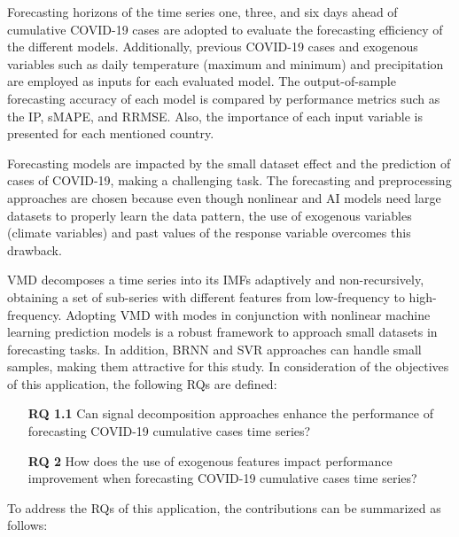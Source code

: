 Forecasting horizons of the time series one, three, and six days ahead of cumulative \ac{COVID-19} cases are adopted to evaluate the forecasting efficiency of the different models. Additionally, previous \ac{COVID-19} cases and exogenous variables such as daily temperature (maximum and minimum) and precipitation are employed as inputs for each evaluated model. The output-of-sample forecasting accuracy of each model is compared by performance metrics such as the \ac{IP}, \ac{sMAPE}, and \ac{RRMSE}. Also, the importance of each input variable is presented for each mentioned country.

Forecasting models are impacted by the small dataset effect and the prediction of cases of \ac{COVID-19}, making a challenging task. The forecasting and preprocessing approaches are chosen because even though nonlinear and \ac{AI} models need large datasets to properly learn the data pattern, the use of exogenous variables (climate variables) and past values of the response variable overcomes this drawback.

\ac{VMD} decomposes a time series into its \ac{IMF}s adaptively and non-recursively, obtaining a set of sub-series with different features from low-frequency to high-frequency. Adopting \ac{VMD} with modes in conjunction with nonlinear machine learning prediction models is a robust framework to approach small datasets in forecasting tasks. In addition, \ac{BRNN} and \ac{SVR} approaches can handle small samples, making them attractive for this study. In consideration of the objectives of this application, the following \ac{RQ}s are defined:

\begin{enumerate}[wide=0pt, leftmargin=3em]
    \item[\textbf{RQ 1.1}] Can signal decomposition approaches enhance the performance of forecasting \ac{COVID-19} cumulative cases time series?
    
    \item[\textbf{RQ 2}] How does the use of exogenous features impact performance improvement when forecasting \ac{COVID-19} cumulative cases time series?
\end{enumerate}

To address the \ac{RQ}s of this application, the contributions can be summarized as follows: 

